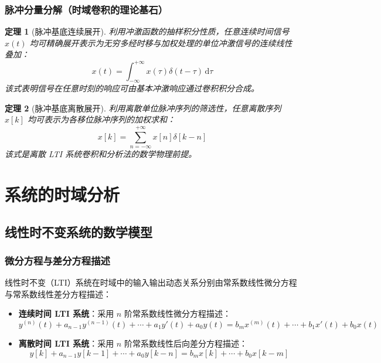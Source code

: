 \documentclass[11pt,a4paper,fontset=fandol]{ctexart}
\newtheorem{theorem}{定理}[section]
\theoremstyle{remark}
\begin{document}
\subsubsection{脉冲分量分解（时域卷积的理论基石）}
\begin{theorem}[脉冲基底连续展开]
利用冲激函数的抽样积分性质，任意连续时间信号 $x(t)$ 均可精确展开表示为无穷多经时移与加权处理的单位冲激信号的连续线性叠加：
\begin{equation}
    x(t) = \int_{-\infty}^{+\infty} x(\tau)\delta(t - \tau)\,\mathrm{d}\tau
\end{equation}
该式表明信号在任意时刻的响应可由基本冲激响应通过卷积积分合成。
\end{theorem}

\begin{theorem}[脉冲基底离散展开]
利用离散单位脉冲序列的筛选性，任意离散序列 $x[k]$ 均可表示为各移位脉冲序列的加权求和：
\begin{equation}
    x[k] = \sum_{n=-\infty}^{+\infty} x[n]\delta[k - n]
\end{equation}
该式是离散 LTI 系统卷积和分析法的数学物理前提。
\end{theorem}

\section{系统的时域分析}

\subsection{线性时不变系统的数学模型}

\subsubsection{微分方程与差分方程描述}
线性时不变（LTI）系统在时域中的输入输出动态关系分别由常系数线性微分方程与常系数线性差分方程描述：
\begin{itemize}
    \item \textbf{连续时间 LTI 系统}：采用 $n$ 阶常系数线性微分方程描述：
    \begin{equation}
        y^{(n)}(t) + a_{n-1}y^{(n-1)}(t) + \cdots + a_1 y'(t) + a_0 y(t) = b_m x^{(m)}(t) + \cdots + b_1 x'(t) + b_0 x(t)
    \end{equation}
    \item \textbf{离散时间 LTI 系统}：采用 $n$ 阶常系数线性后向差分方程描述：
    \begin{equation}
        y[k] + a_{n-1}y[k-1] + \cdots + a_0 y[k-n] = b_m x[k] + \cdots + b_0 x[k-m]
    \end{equation}
\end{itemize}
\end{document}

